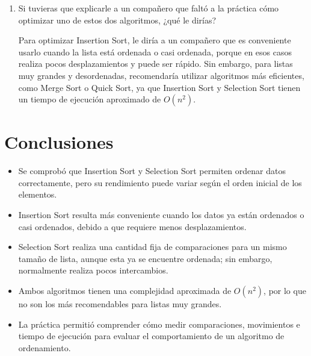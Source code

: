 \documentclass{article}
\begin{document}
\begin{enumerate}
			La parte que más me costó entender fue la diferencia entre los
			desplazamientos de Insertion Sort y los intercambios de Selection Sort. Lo resolví
			siguiendo manualmente una lista pequeña y observando qué ocurría en cada
			iteración. Así comprendí que Insertion Sort mueve elementos para insertar uno en
			su posición correcta, mientras que Selection Sort busca el menor o mayor elemento
			y realiza un intercambio al final de cada pasada.

			\item Si tuvieras que explicarle a un compañero que faltó a la práctica cómo
	optimizar uno de estos dos algoritmos, ¿qué le dirías? 
			
			Para optimizar Insertion Sort, le diría a un compañero que es conveniente
			usarlo cuando la lista está ordenada o casi ordenada, porque en esos casos realiza
			pocos desplazamientos y puede ser rápido. Sin embargo, para listas muy grandes y
			desordenadas, recomendaría utilizar algoritmos más eficientes, como Merge Sort o
			Quick Sort, ya que Insertion Sort y Selection Sort tienen un tiempo de ejecución
			aproximado de $O(n^2)$.
		\end{enumerate}

	\section{Conclusiones}

	\begin{itemize}
		\item Se comprobó que Insertion Sort y Selection Sort permiten ordenar datos
		correctamente, pero su rendimiento puede variar según el orden inicial de los
		elementos.

		\item Insertion Sort resulta más conveniente cuando los datos ya están ordenados o
		casi ordenados, debido a que requiere menos desplazamientos.

		\item Selection Sort realiza una cantidad fija de comparaciones para un mismo
		tamaño de lista, aunque esta ya se encuentre ordenada; sin embargo, normalmente
		realiza pocos intercambios.

		\item Ambos algoritmos tienen una complejidad aproximada de $O(n^2)$, por lo que
		no son los más recomendables para listas muy grandes.

		\item La práctica permitió comprender cómo medir comparaciones, movimientos e
		tiempo de ejecución para evaluar el comportamiento de un algoritmo de
		ordenamiento.
	\end{itemize}
\end{document}
